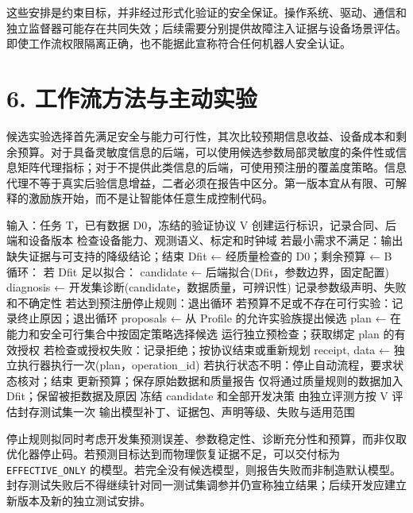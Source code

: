 \documentclass[
  chinese,
  11pt,
  a4paper,
  fontset=fandol]{ctexart}
\newenvironment{Shaded}{}{}
\newcommand{\NormalTok}[1]{#1}
\begin{document}
这些安排是约束目标，并非经过形式化验证的安全保证。操作系统、驱动、通信和独立监督器可能存在共同失效；后续需要分别提供故障注入证据与设备场景评估。即使工作流权限隔离正确，也不能据此宣称符合任何机器人安全认证。

\section{6.
工作流方法与主动实验}\label{ux5de5ux4f5cux6d41ux65b9ux6cd5ux4e0eux4e3bux52a8ux5b9eux9a8c}

候选实验选择首先满足安全与能力可行性，其次比较预期信息收益、设备成本和剩余预算。对于具备灵敏度信息的后端，可以使用候选参数局部灵敏度的条件性或信息矩阵代理指标；对于不提供此类信息的后端，可使用预注册的覆盖度策略。信息代理不等于真实后验信息增益，二者必须在报告中区分。第一版本宜从有限、可解释的激励族开始，而不是让智能体任意生成控制代码。

\begin{Shaded}
\begin{Highlighting}[]
\NormalTok{输入：任务 T，已有数据 D0，冻结的验证协议 V}
\NormalTok{创建运行标识，记录合同、后端和设备版本}
\NormalTok{检查设备能力、观测语义、标定和时钟域}
\NormalTok{若最小需求不满足：输出缺失证据与可支持的降级结论；结束}
\NormalTok{Dfit ← 经质量检查的 D0；剩余预算 ← B}
\NormalTok{循环：}
\NormalTok{    若 Dfit 足以拟合：}
\NormalTok{        candidate ← 后端拟合(Dfit，参数边界，固定配置)}
\NormalTok{        diagnosis ← 开发集诊断(candidate，数据质量，可辨识性)}
\NormalTok{        记录参数级声明、失败和不确定性}
\NormalTok{        若达到预注册停止规则：退出循环}
\NormalTok{    若预算不足或不存在可行实验：记录终止原因；退出循环}
\NormalTok{    proposals ← 从 Profile 的允许实验族提出候选}
\NormalTok{    plan ← 在能力和安全可行集合中按固定策略选择候选}
\NormalTok{    运行独立预检查；获取绑定 plan 的有效授权}
\NormalTok{    若检查或授权失败：记录拒绝；按协议结束或重新规划}
\NormalTok{    receipt, data ← 独立执行器执行一次(plan，operation\_id)}
\NormalTok{    若执行状态不明：停止自动流程，要求状态核对；结束}
\NormalTok{    更新预算；保存原始数据和质量报告}
\NormalTok{    仅将通过质量规则的数据加入 Dfit；保留被拒数据及原因}
\NormalTok{冻结 candidate 和全部开发决策}
\NormalTok{由独立评测方按 V 评估封存测试集一次}
\NormalTok{输出模型补丁、证据包、声明等级、失败与适用范围}
\end{Highlighting}
\end{Shaded}

停止规则拟同时考虑开发集预测误差、参数稳定性、诊断充分性和预算，而非仅取优化器停止码。若预测目标达到而物理恢复证据不足，可以交付标为
\texttt{EFFECTIVE\_ONLY}
的模型。若完全没有候选模型，则报告失败而非制造默认模型。封存测试失败后不得继续针对同一测试集调参并仍宣称独立结果；后续开发应建立新版本及新的独立测试安排。
\end{document}
